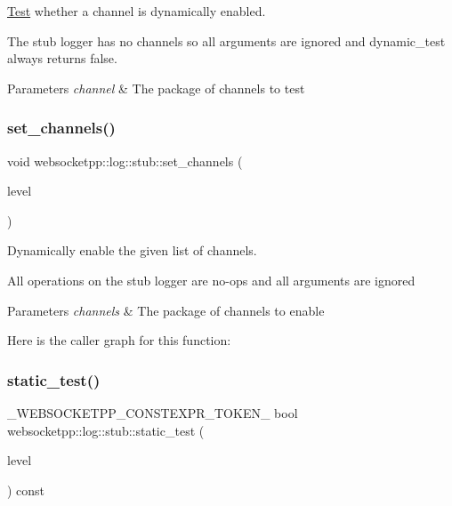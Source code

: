 \mbox{\hyperlink{struct_test}{Test}} whether a channel is dynamically enabled. 

The stub logger has no channels so all arguments are ignored and {\ttfamily dynamic\+\_\+test} always returns false.


\begin{DoxyParams}{Parameters}
{\em channel} & The package of channels to test \\
\hline
\end{DoxyParams}
\mbox{\label{classwebsocketpp_1_1log_1_1stub_acdaf1728646e2477cf7243b13f71e18d}} 
\subsubsection{\texorpdfstring{set\+\_\+channels()}{set\_channels()}}
{\footnotesize\ttfamily void websocketpp\+::log\+::stub\+::set\+\_\+channels (\begin{DoxyParamCaption}\item[{level}]{ }\end{DoxyParamCaption})\hspace{0.3cm}{\ttfamily [inline]}}



Dynamically enable the given list of channels. 

All operations on the stub logger are no-\/ops and all arguments are ignored


\begin{DoxyParams}{Parameters}
{\em channels} & The package of channels to enable \\
\hline
\end{DoxyParams}
Here is the caller graph for this function\+:
\mbox{\label{classwebsocketpp_1_1log_1_1stub_a50ba8bfb0b2af7c494820a728eff0857}} 
\subsubsection{\texorpdfstring{static\+\_\+test()}{static\_test()}}
{\footnotesize\ttfamily \+\_\+\+W\+E\+B\+S\+O\+C\+K\+E\+T\+P\+P\+\_\+\+C\+O\+N\+S\+T\+E\+X\+P\+R\+\_\+\+T\+O\+K\+E\+N\+\_\+ bool websocketpp\+::log\+::stub\+::static\+\_\+test (\begin{DoxyParamCaption}\item[{level}]{ }\end{DoxyParamCaption}) const\hspace{0.3cm}{\ttfamily [inline]}}



